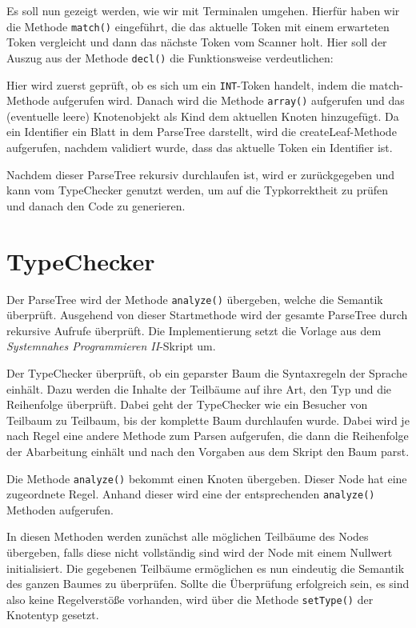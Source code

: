 Es soll nun gezeigt werden, wie wir mit Terminalen umgehen. Hierfür haben wir die Methode \texttt{match()} eingeführt, die das aktuelle Token mit einem erwarteten Token vergleicht und dann das nächste Token vom Scanner holt. Hier soll der Auszug aus der Methode \texttt{decl()} die Funktionsweise verdeutlichen:



Hier wird zuerst geprüft, ob es sich um ein \texttt{INT}-Token handelt, indem die match-Methode aufgerufen wird. Danach wird die Methode \texttt{array()} aufgerufen und das (eventuelle leere) Knotenobjekt als Kind dem aktuellen Knoten hinzugefügt. Da ein Identifier ein Blatt in dem ParseTree darstellt, wird die createLeaf-Methode aufgerufen, nachdem validiert wurde, dass das aktuelle Token ein Identifier ist.

Nachdem dieser ParseTree rekursiv durchlaufen ist, wird er zurückgegeben und kann vom TypeChecker genutzt werden, um auf die Typkorrektheit zu prüfen und danach den Code zu generieren.


\section{TypeChecker}
Der ParseTree wird der Methode \texttt{analyze()} übergeben, welche die Semantik überprüft. Ausgehend von dieser Startmethode wird der gesamte ParseTree durch rekursive Aufrufe überprüft. Die Implementierung setzt die Vorlage aus dem \emph{Systemnahes Programmieren II}-Skript um.

Der TypeChecker überprüft, ob ein geparster Baum die Syntaxregeln der Sprache einhält. Dazu werden die Inhalte der Teilbäume auf ihre Art, den Typ und die Reihenfolge überprüft. Dabei geht der TypeChecker wie ein Besucher von Teilbaum zu Teilbaum, bis der komplette Baum durchlaufen wurde.
Dabei wird je nach Regel eine andere Methode zum Parsen aufgerufen, die dann die Reihenfolge der Abarbeitung einhält und nach den Vorgaben aus dem Skript den Baum parst.

Die Methode \texttt{analyze()} bekommt einen Knoten übergeben. Dieser Node hat eine zugeordnete Regel. Anhand dieser wird eine der entsprechenden \texttt{analyze()} Methoden aufgerufen.

In diesen Methoden werden zunächst alle möglichen Teilbäume des Nodes übergeben, falls diese nicht vollständig sind wird der Node mit einem Nullwert initialisiert.
Die gegebenen Teilbäume ermöglichen es nun eindeutig die Semantik des ganzen Baumes zu überprüfen. Sollte die Überprüfung erfolgreich sein, es sind also keine Regelverstöße vorhanden, wird über die Methode \texttt{setType()} der Knotentyp gesetzt.

